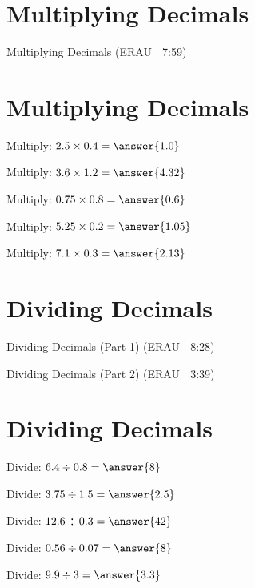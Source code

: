 \documentclass{ximera}
\begin{document}
\section*{Multiplying Decimals}

Multiplying Decimals (ERAU | 7:59)



\section*{Multiplying Decimals}

\begin{problem}
Multiply: $2.5 \times 0.4 = \answer{1.0}$
\end{problem}

\begin{problem}
Multiply: $3.6 \times 1.2 = \answer{4.32}$
\end{problem}

\begin{problem}
Multiply: $0.75 \times 0.8 = \answer{0.6}$
\end{problem}

\begin{problem}
Multiply: $5.25 \times 0.2 = \answer{1.05}$
\end{problem}

\begin{problem}
Multiply: $7.1 \times 0.3 = \answer{2.13}$
\end{problem}


\section*{Dividing Decimals}

Dividing Decimals (Part 1) (ERAU | 8:28)


Dividing Decimals (Part 2) (ERAU | 3:39)



\section*{Dividing Decimals}

\begin{problem}
Divide: $6.4 \div 0.8 = \answer{8}$
\end{problem}

\begin{problem}
Divide: $3.75 \div 1.5 = \answer{2.5}$
\end{problem}

\begin{problem}
Divide: $12.6 \div 0.3 = \answer{42}$
\end{problem}

\begin{problem}
Divide: $0.56 \div 0.07 = \answer{8}$
\end{problem}

\begin{problem}
Divide: $9.9 \div 3 = \answer{3.3}$
\end{problem}

\end{document}
